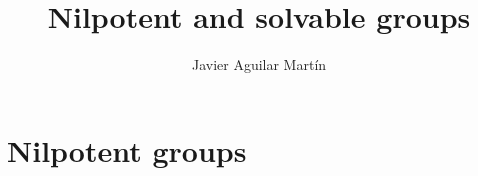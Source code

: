 \documentclass[twoside]{article}
\begin{document}
\title{Nilpotent and solvable groups}
\author{Javier Aguilar Martín}
\maketitle

\section{Nilpotent groups}

\begin{ejercicio}{1.1}

\begin{enumerate}

\end{enumerate}

\end{ejercicio}
\begin{solucion}


\end{solucion}

\newpage

\begin{ejercicio}{1.2}

\end{ejercicio}
\begin{solucion}


\end{solucion}




\newpage

\begin{ejercicio}{1.3}

\end{ejercicio}
\begin{solucion}

\end{solucion}

\newpage

\begin{ejercicio}{1.4}

\end{ejercicio}
\begin{solucion}

\end{solucion}

\newpage

\begin{ejercicio}{1.5}

\end{ejercicio}
\begin{solucion}

\end{solucion}
\end{document}
